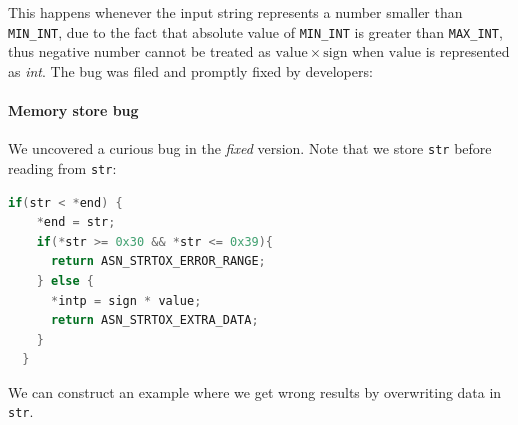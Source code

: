 \documentclass[acmsmall,nonacm]{acmart}
\begin{document}
 
This happens whenever the input string represents a number smaller than \texttt{MIN\_INT}, due to the fact that absolute value of \texttt{MIN\_INT} is greater than \texttt{MAX\_INT}, thus negative number cannot be treated as $\mathrm{value}\times\mathrm{sign}$ when $\mathrm{value}$ is represented as \textit{int}. The bug  was filed and promptly fixed by developers:

   
  

  
  \paragraph{Memory store bug}
  We uncovered a curious bug in the \emph{fixed} version. Note that we
  store \texttt{str} before reading from \texttt{str}:

\begin{lstlisting}[language=C]
  if(str < *end) {
    *end = str;
    if(*str >= 0x30 && *str <= 0x39){
      return ASN_STRTOX_ERROR_RANGE;
    } else {
      *intp = sign * value;
      return ASN_STRTOX_EXTRA_DATA;
    }
  }
\end{lstlisting}
  
     We can construct an example where we get wrong results by overwriting data in \texttt{str}.

  








\end{document}
